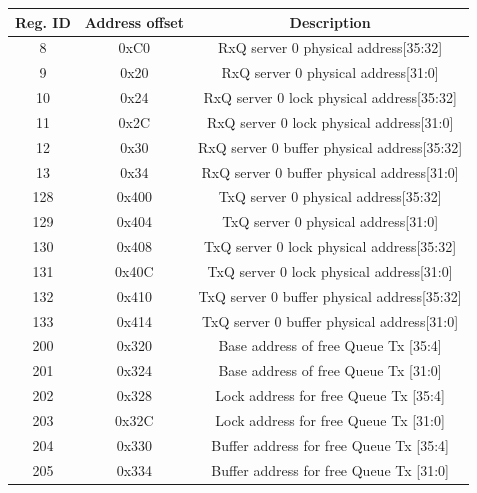 \documentclass[12pt]{report}
\begin{document}
\begin{appendices}
			\begin{table}[h!]
				\centering
				\begin{tabular}{|c|c|c|}
					\hline
					Reg. ID& Address offset & Description  \\ \hline
					
				
                         8  & 0xC0   & RxQ server 0  physical address[35:32]      \\ \hline
                         9  & 0x20   & RxQ server 0  physical address[31:0]  \\ \hline
                         10  & 0x24   & RxQ server 0  lock physical address[35:32]  \\ \hline
					11  & 0x2C   & RxQ server 0  lock physical address[31:0]  \\ \hline
					12  & 0x30   & RxQ server 0 buffer physical address[35:32] \\ \hline
                        13  & 0x34   & RxQ server 0 buffer physical address[31:0] \\ \hline

                        128  & 0x400   & TxQ server 0  physical address[35:32]      \\ \hline
                         129  & 0x404   & TxQ server 0  physical address[31:0]  \\ \hline
                         130  & 0x408   & TxQ server 0  lock physical address[35:32]  \\ \hline
					131  & 0x40C   & TxQ server 0  lock physical address[31:0]  \\ \hline
					132  & 0x410   & TxQ server 0 buffer physical address[35:32] \\ \hline
                        133  & 0x414   & TxQ server 0 buffer physical address[31:0] \\ \hline

                       200  & 0x320   & Base address of free Queue Tx  [35:4]      \\ \hline
                         201  & 0x324    & Base address of free Queue Tx [31:0]  \\ \hline
                         202  & 0x328   & Lock address for free Queue Tx [35:4]  \\ \hline
					203  & 0x32C   & Lock address for free Queue Tx [31:0]  \\ \hline
					204  & 0x330   & Buffer address for free Queue Tx [35:4] \\ \hline
                        205  & 0x334   & Buffer address for free Queue Tx [31:0] \\ \hline






\end{tabular}
\end{table}
\end{appendices}
\end{document}
